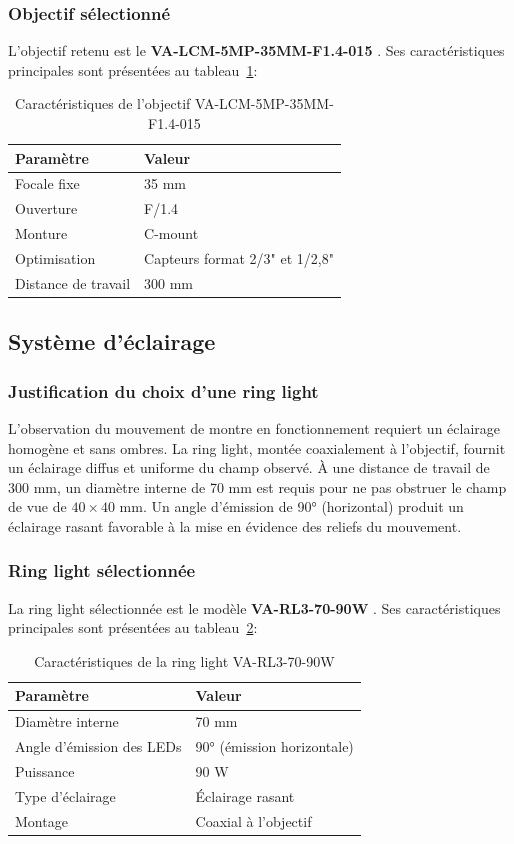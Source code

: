 \subsubsection{Objectif sélectionné}
L'objectif retenu est le \textbf{VA-LCM-5MP-35MM-F1.4-015} \cite{va_imaging_lcm5mp}. 
Ses caractéristiques principales sont présentées au tableau~\ref{tab:specs_objectif}:
\begin{table}[H]
  \centering
  \caption{Caractéristiques de l'objectif VA-LCM-5MP-35MM-F1.4-015}
  \label{tab:specs_objectif}
  \begin{tabular}{ll}
    \toprule
    \textbf{Paramètre} & \textbf{Valeur} \\
    \midrule
    Focale fixe & 35 mm \\
    Ouverture & F/1.4 \\
    Monture & C-mount \\
    Optimisation & Capteurs format 2/3" et 1/2,8" \\
    Distance de travail & 300 mm \\
    \bottomrule
  \end{tabular}
\end{table}
\subsection{Système d'éclairage}
\subsubsection{Justification du choix d'une ring light}
L'observation du mouvement de montre en fonctionnement requiert un éclairage homogène et sans ombres. 
La ring light, montée coaxialement à l'objectif, fournit un éclairage diffus et uniforme du champ observé. 
À une distance de travail de 300 mm, un diamètre interne de 70 mm est requis pour ne pas obstruer le champ de vue de $40 \times 40$ mm. 
Un angle d'émission de 90° (horizontal) produit un éclairage rasant favorable à la mise en évidence des reliefs du mouvement.
\subsubsection{Ring light sélectionnée}
La ring light sélectionnée est le modèle \textbf{VA-RL3-70-90W} \cite{va_imaging_rl3}. 
Ses caractéristiques principales sont présentées au tableau~\ref{tab:specs_ringlight}:
\begin{table}[H]
  \centering
  \caption{Caractéristiques de la ring light VA-RL3-70-90W}
  \label{tab:specs_ringlight}
  \begin{tabular}{ll}
    \toprule
    \textbf{Paramètre} & \textbf{Valeur} \\
    \midrule
    Diamètre interne & 70 mm \\
    Angle d'émission des LEDs & 90° (émission horizontale) \\
    Puissance & 90 W \\
    Type d'éclairage & Éclairage rasant \\
    Montage & Coaxial à l'objectif \\
    \bottomrule
  \end{tabular}
\end{table}
